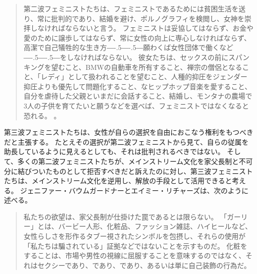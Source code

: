 \documentclass[paper=a4,book,openany]{jlreq}
\def\DDASH{―\kern-.5\zw―\kern-.5\zw―} %
\begin{document}
\begin{quote}
  第二波フェミニストたちは、フェミニストであるためには貧困生活を送り、常に批判的であり、結婚を避け、ポルノグラフィを検閲し、女神を崇拝しなければならないと言う。
フェミニストは妥協してはならず、お金や愛のために譲歩してはならず、常に女性の向上に専心しなければならず、高潔で自己犠牲的な生き方{\DDASH}願わくば女性団体で働くなど{\DDASH}をしなければならない。
彼女たちは、セックスの前にスパンキングを望むこと、BMWの自動車を所有すること、禅宗の僧侶となること、「レディ」として扱われることを望むこと、人種的抑圧をジェンダー抑圧よりも優先して問題化すること、なヒップホップ音楽を愛すること、自分を虐待した父親といまだに会話すること、結婚し、モンタナの農場で3人の子供を育てたいと願うなどを選べば、フェミニストではなくなると恐れる。
\citep[p.xxxii]{walker95:_to_be_real}。
\end{quote}

第三波フェミニストたちは、女性が自らの選択を自由におこなう権利をもつべきだと主張する。
たとえその選択が第二波フェミニストから見て、自らの従属を助長しているように見えるとしても、それは批判されるべきではない。
そして、多くの第二波フェミニストたちが、メインストリーム文化を家父長制と不可分に結びついたものとして拒否すべきだと訴えたのに対し、第三波フェミニストたちは、メインストリーム文化を逆用し、解放の手段として活用できると考える。
ジェニファー・バウムガードナーとエイミー・リチャーズは、次のように述べる。

\begin{quote}
  私たちの欲望は、家父長制が仕掛けた罠であるとは限らない。
「ガーリー」とは、バービー人形、化粧品、ファッション雑誌、ハイヒールなど、女性らしさを形作るタブー視されたシンボルを包摂し、それらの使用が「私たちは騙されている」証拠などではないことを示すものだ。
化粧をすることは、市場や男性の視線に屈服することを意味するのではなく、それはセクシーであり、であり、であり、あるいは単に自己装飾の行為だ。
\citep[pp. 302--303]{baumgardner06:_manif}

\end{quote}
\end{document}
